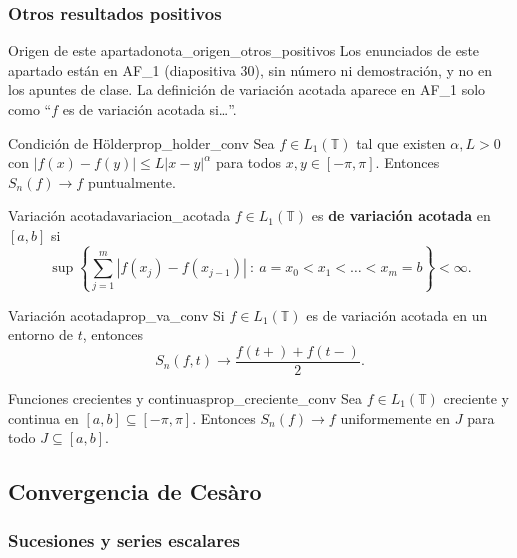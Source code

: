 \subsubsection{Otros resultados positivos}

\begin{nota}{Origen de este apartado}{nota_origen_otros_positivos}
Los enunciados de este apartado están en AF\_1 (diapositiva 30), sin número ni demostración, y no en los apuntes de clase. La definición de variación acotada aparece en AF\_1 solo como ``$f$ es de variación acotada si\dots''.
\end{nota}

\begin{proposicion}{Condición de Hölder}{prop_holder_conv}
Sea $f \in L_1(\mathbb{T})$ tal que existen $\alpha, L > 0$ con $|f(x) - f(y)| \le L|x - y|^\alpha$ para todos $x, y \in [-\pi, \pi]$. Entonces $S_n(f) \to f$ puntualmente.
\end{proposicion}

\begin{definicion}{Variación acotada}{variacion_acotada}
$f \in L_1(\mathbb{T})$ es \textbf{de variación acotada} en $[a, b]$ si
\[
\sup\left\{\sum_{j=1}^{m}|f(x_j) - f(x_{j-1})| \ : \ a = x_0 < x_1 < \dots < x_m = b\right\} < \infty.
\]
\end{definicion}

\begin{proposicion}{Variación acotada}{prop_va_conv}
Si $f \in L_1(\mathbb{T})$ es de variación acotada en un entorno de $t$, entonces
\[
S_n(f, t) \to \frac{f(t+) + f(t-)}{2}.
\]
\end{proposicion}

\begin{proposicion}{Funciones crecientes y continuas}{prop_creciente_conv}
Sea $f \in L_1(\mathbb{T})$ creciente y continua en $[a, b] \subseteq [-\pi, \pi]$. Entonces $S_n(f) \to f$ uniformemente en $J$ para todo $J \subseteq [a, b]$.
\end{proposicion}

\subsection{Convergencia de Cesàro}

\subsubsection{Sucesiones y series escalares}

